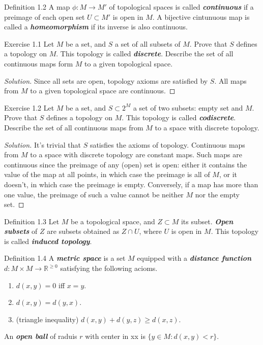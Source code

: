 \begin{thing3}{Definition 1.2}\leavevmode
	A map $\phi:M\to M'$ of topological spaces is called \textit{\textbf{continuous}} if a preimage of each open set $U \subset M'$ is open in $M$. A bijective cintunuous map is called a \textit{\textbf{homeomorphism}} if its inverse is also continuous.
\end{thing3}

\begin{thing4}{Exercise 1.1}\leavevmode
	Let $M$ be a set, and $S$ a set of all subsets of $M$. Prove that $S$ defines a topology on $M$. This topology is called \textit{\textbf{discrete}}. Describe the set of all continuous maps form $M$ to a given topological space.
\end{thing4}

\begin{proof}[Solution]\leavevmode
Since all sets are open, topology axioms are satisfied by $S$. All maps from $M$ to a given topological space are continuous.
\end{proof}

\begin{thing4}{Exercise 1.2}\leavevmode
	Let $M$ be a set, and $S \subset 2^M$ a set of two subsets: empty set and $M$. Prove that $S$ defines a topology on $M$. This topology is called \textit{\textbf{codiscrete}}. Describe the set of all continuous maps from $M$ to a space with discrete topology.
\end{thing4}

\begin{proof}[Solution]\leavevmode
It's trivial that $S$ satisfies the axioms of topology. Continuous maps from $M$ to a space with discrete topology are constant maps. Such maps are continuous since the preimage of any (open) set is open: either it contains the value of the map at all points, in which case the preimage is all of $M$, or it doesn't, in which case the preimage is empty. Conversely, if a map has more than one value, the preimage of such a value cannot be neither $M$ nor the empty set.
\end{proof}

\begin{thing3}{Definition 1.3}\leavevmode
	Let $M$ be a topological space, and $Z \subset M$ its subset. \textit{\textbf{Open subsets}} of $Z$ are subsets obtained as $Z \cap U$, where $U$ is open in $M$. This topology is called \textit{\textbf{induced topology}}.
\end{thing3}

\begin{thing3}{Definition 1.4}\leavevmode
	A \textit{\textbf{metric space}} is a set $M$ equipped with a \textit{\textbf{distance function}} $d: M \times M \longrightarrow \mathbb{R}^{\geq 0}$ satisfying the following acioms.
	\begin{enumerate}
	\item $d(x,y)=0$ iff $x=y$.
	\item $d(x,y)=d(y,x)$.
	\item (triangle inequality) $d(x,y)+d(y,z) \geq d(x,z)$.
	\end{enumerate}
An \textit{\textbf{open ball}} of raduis $r$ with center in xx is $\{y \in M: d(x,y)<r\}$.
\end{thing3}

